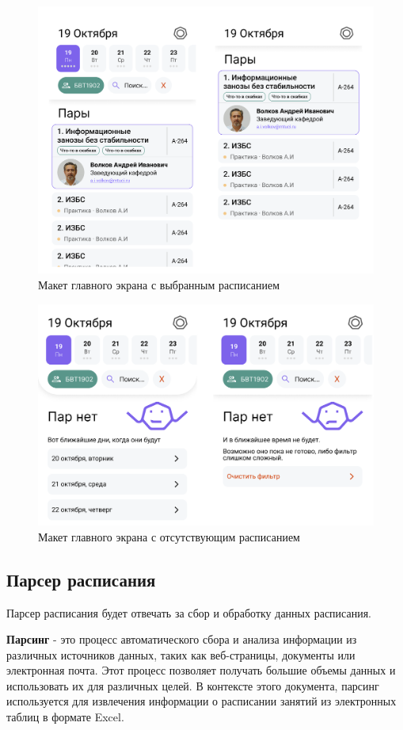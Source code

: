 \begin{figure}
  \centering
  \includegraphics[width=0.8\linewidth]{images/figma/main.png}
  \caption{Макет главного экрана с выбранным расписанием}
  \label{fig:figma:main}
\end{figure}

\begin{figure}
  \centering
  \includegraphics[width=0.8\linewidth]{images/figma/main_2.png}
  \caption{Макет главного экрана с отсутствующим расписанием}
  \label{fig:figma:main_2}
\end{figure}

\break
\subsection{Парсер расписания}
Парсер расписания будет отвечать за сбор и обработку данных расписания.

\textbf{Парсинг} - это процесс автоматического сбора и анализа информации из различных источников данных,
таких как веб-страницы, документы или электронная почта.
Этот процесс позволяет получать большие объемы данных и использовать их для различных целей.
В контексте этого документа, парсинг используется для извлечения информации о
расписании занятий из электронных таблиц в формате Excel.

